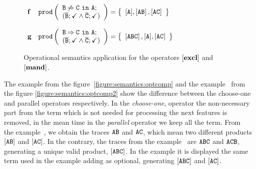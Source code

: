 \begin{figure}[h]
	$\begin{array}{ll}
	\EX{f} &
	\products{\begin{array}{l}\exclude{B}{C}{ \feature{A};\\(\ofeature{B};\checkmark\paral \ofeature{C};\checkmark)}\end{array}}=
	\left\{
	\begin{array}{l}
	[\feature{A}],
	\left[\feature{A}\feature{B}\right],
	\left[\feature{A}\feature{C}\right]\\
	\end{array}
	\right\}
	\\ \\
	\EX{g}&
	\products{\begin{array}{l}\require{B}{C}{ \feature{A};\\(\ofeature{B};\checkmark\paral \ofeature{C};\checkmark)}\end{array}}=
	\left\{
	\begin{array}{l}
	
	\left[\feature{A}\feature{B}\feature{C}\right],
	[\feature{A}],\left[\feature{A}\feature{C}\right]\\
	\end{array}
	\right\}
	\end{array}$	
	\vspace{0.5cm}
	
	\linefigure	
	
	\caption{Operational semantics application for the operators
		$\mathbf{[excl]}$ and $\mathbf{[mand]}$.\label{figure:semantics:optcomp3}}
	
\end{figure}

The example  from the figure~\ref{figure:semantics:optcomp}
and the example~ from the figure \ref{figure:semantics:optcomp2}
show the difference between the choose-one and parallel operators respectively.
In the \emph{choose-one}, operator the non-necessary part from the term which is not
needed for processing the next features is removed, 
in the mean time in the \emph{parallel} operator we keep all the term.
From the example~, we obtain the traces
$\mathtt{A}\mathtt{B}$ and $\mathtt{A}\mathtt{C}$,
which mean two different products
$[\mathtt{A}\mathtt{B}]$ and $[\mathtt{A}\mathtt{C}]$.
In the contrary, the traces from the example~ are $\mathtt{A}\mathtt{B}\mathtt{C}$ and $\mathtt{A}\mathtt{C}\mathtt{B}$,
generating a unique valid product,
$[\mathtt{A}\mathtt{B}\mathtt{C}]$.
In the example  it is displayed the same term used in the
example  adding  as optional, generating
$[\mathtt{A}\mathtt{B}\mathtt{C}]$ and
$[\mathtt{A}\mathtt{C}]$.

